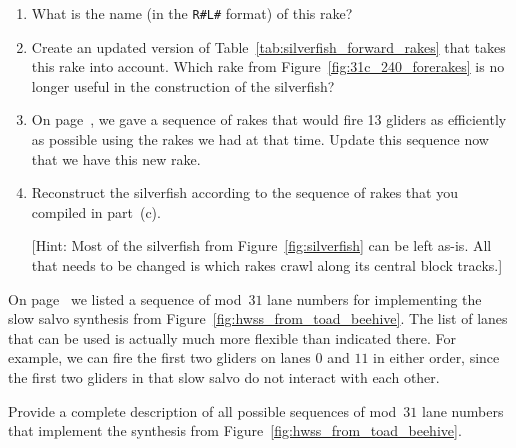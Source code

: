 \begin{multicols}{2}
\begin{problem}
		\begin{enumerate}[label=\bf\color{ocre}(\alph*)]
			\item What is the name (in the \texttt{R\#L\#} format) of this rake?
			
			\item Create an updated version of Table~\ref{tab:silverfish_forward_rakes} that takes this rake into account. Which rake from Figure~\ref{fig:31c_240_forerakes} is no longer useful in the construction of the silverfish?
			
			\item On page~\pageref{page:silverfish_rake_seq}, we gave a sequence of rakes that would fire 13 gliders as efficiently as possible using the rakes we had at that time. Update this sequence now that we have this new rake.
			
			\item Reconstruct the silverfish according to the sequence of rakes that you compiled in part~(c).
			
			[Hint: Most of the silverfish from Figure~\ref{fig:silverfish} can be left as-is. All that needs to be changed is which rakes crawl along its central block tracks.]
		\end{enumerate}
	\end{problem}
	
	
	\mfilbreak
	
	
	\begin{problem}\label{exer:silverfish_list_of_lanes}
		On page~\pageref{page:silverfish_lanes} we listed a sequence of mod~$31$ lane numbers for implementing the slow salvo synthesis from Figure~\ref{fig:hwss_from_toad_beehive}. The list of lanes that can be used is actually much more flexible than indicated there. For example, we can fire the first two gliders on lanes $0$ and $11$ in either order, since the first two gliders in that slow salvo do not interact with each other.
		
		Provide a complete description of all possible sequences of mod~$31$ lane numbers that implement the synthesis from Figure~\ref{fig:hwss_from_toad_beehive}.
	\end{problem}
	
	
	\mfilbreak
	

\end{multicols}
